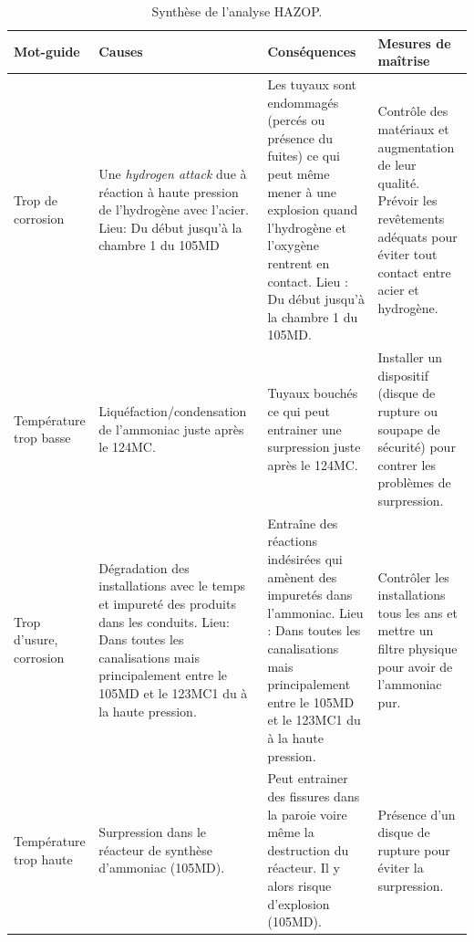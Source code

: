 	\begin{table}[ht!]
		\centering
		{
			\begin{tabular}{|p{0.25\textwidth}|p{}|p{}|p{}|}
				\rowcolor{Gray} Mot-guide		& Causes 	& Conséquences 	&	Mesures de maîtrise 	\\
				\hline
				Trop de corrosion		 
				& Une \textit{hydrogen attack} due à réaction à haute pression 
				de l'hydrogène avec l'acier. Lieu: Du début jusqu'à la chambre 1 du 105MD
				& Les tuyaux sont endommagés (percés ou présence du fuites) ce qui peut
				même mener à une explosion quand l'hydrogène et l'oxygène rentrent en contact. 
				Lieu : Du début jusqu'à la chambre 1 du 105MD.	 
				& Contrôle des matériaux	et augmentation de leur qualité. Prévoir les revêtements adéquats pour éviter tout contact entre acier et hydrogène. 	\\				
				\hline
				Température	trop basse	
				& Liquéfaction/condensation de l'ammoniac juste après le 124MC.	
				& Tuyaux bouchés ce qui peut entrainer une surpression juste après le 124MC.  
				& Installer un dispositif (disque de rupture ou soupape de sécurité) pour contrer
					les problèmes de surpression. \\
				\hline 
				Trop d'usure, corrosion	
				& Dégradation des installations avec le temps et impureté des produits 
				dans les conduits. Lieu: Dans toutes les canalisations mais principalement entre 
				le 105MD et le 123MC1 du à la haute pression.	
				& Entraîne des réactions indésirées qui amènent des impuretés dans l'ammoniac. 
				Lieu : Dans toutes les canalisations mais principalement entre le 105MD et le 123MC1 
				du à la haute pression.	 
				&  Contrôler les installations tous les ans et mettre un filtre physique pour avoir de l'ammoniac pur.	\\
				\hline
				Température trop haute	
				&	Surpression dans le réacteur de synthèse d'ammoniac (105MD).				
				& Peut entrainer des fissures dans la paroie voire même la destruction du réacteur. 
				Il y alors risque d'explosion (105MD).							
				& Présence d'un disque de rupture pour éviter la surpression. \\
				\hline
			\end{tabular}
		}
		\caption{Synthèse de l'analyse HAZOP.}
	\end{table}

\newpage
{}



